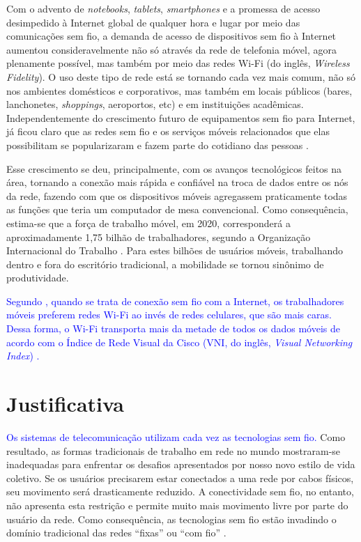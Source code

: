Com o advento de \textit{notebooks}, \textit{tablets}, \textit{smartphones} e a promessa de acesso desimpedido à Internet global de qualquer hora e lugar por meio das comunicações sem fio, a demanda de acesso de dispositivos sem fio à Internet aumentou consideravelmente não só através da rede de telefonia móvel, agora plenamente possível, mas também por meio das redes Wi-Fi (do inglês, \textit{Wireless Fidelity}). O uso deste tipo de rede está se tornando cada vez mais comum, não só nos ambientes domésticos e corporativos, mas também em locais públicos (bares, lanchonetes, \textit{shoppings}, aeroportos, etc) e em instituições acadêmicas. Independentemente do crescimento futuro de equipamentos sem fio para Internet, já ficou claro que as redes sem fio e os serviços móveis relacionados que elas possibilitam se popularizaram e fazem parte do cotidiano das pessoas \cite{gast2002,kurose2013}.

Esse crescimento se deu, principalmente, com os avanços tecnológicos feitos na área, tornando a conexão mais rápida e confiável na troca de dados entre os nós da rede, fazendo com que os dispositivos móveis agregassem praticamente todas as funções que teria um computador de mesa convencional. Como consequência, estima-se que a força de trabalho móvel, em 2020, corresponderá a aproximadamente 1,75 bilhão de trabalhadores, segundo a Organização Internacional do Trabalho \cite{wba2017}. Para estes bilhões de usuários móveis, trabalhando dentro e fora do escritório tradicional, a mobilidade se tornou sinônimo de produtividade.

\textcolor{blue}{Segundo , quando se trata de conexão sem fio com a Internet, os trabalhadores móveis preferem redes Wi-Fi ao invés de redes celulares, que são mais caras. Dessa forma, o Wi-Fi transporta mais da metade de todos os dados móveis de acordo com o Índice de Rede Visual da Cisco (VNI, do inglês, \textit{Visual Networking Index}) \cite{wba2017}.}

\section{Justificativa}
\label{sec:justificativa}

\textcolor{blue}{Os sistemas de telecomunicação utilizam cada vez as tecnologias sem fio.} Como resultado, as formas tradicionais de trabalho em rede no mundo mostraram-se inadequadas para enfrentar os desafios apresentados por nosso novo estilo de vida coletivo. Se os usuários precisarem estar conectados a uma rede por cabos físicos, seu movimento será drasticamente reduzido. A conectividade sem fio, no entanto, não apresenta esta restrição e permite muito mais movimento livre por parte do usuário da rede. Como consequência, as tecnologias sem fio estão invadindo o domínio tradicional das redes ``fixas'' ou ``com fio'' \cite{gast2002}.

